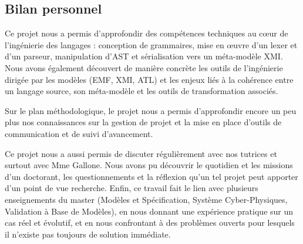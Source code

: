 \documentclass[a4paper, 11pt]{article}
\begin{document}
\subsection{Bilan personnel}

Ce projet nous a permis d’approfondir des compétences techniques au cœur de l’ingénierie des langages : conception de grammaires, mise en œuvre d’un lexer et d’un parseur, manipulation d’AST et sérialisation vers un méta-modèle XMI. Nous avons également découvert de manière concrète les outils de l’ingénierie dirigée par les modèles (EMF, XMI, ATL) et les enjeux liés à la cohérence entre un langage source, son méta-modèle et les outils de transformation associés.

Sur le plan méthodologique, le projet nous a permis d’approfondir encore un peu plus nos connaissances sur la gestion de projet et la mise en place d’outils de communication et de suivi d’avancement.


Ce projet nous a aussi permis de discuter régulièrement avec nos tutrices et surtout avec Mme Gallone. Nous avons pu découvrir le quotidien et les missions d’un doctorant, les questionnements et la réflexion qu’un tel projet peut apporter d’un point de vue recherche. Enfin, ce travail fait le lien avec plusieurs enseignements du master (Modèles et Spécification, Système Cyber-Physiques, Validation à Base de Modèles), en nous donnant une expérience pratique sur un cas réel et évolutif, et en nous confrontant à des problèmes ouverts pour lesquels il n’existe pas toujours de solution immédiate.


\clearpage
{}
{}
\listoffigures

{}
\lstlistoflistings

{}
\listoftables
\end{document}
